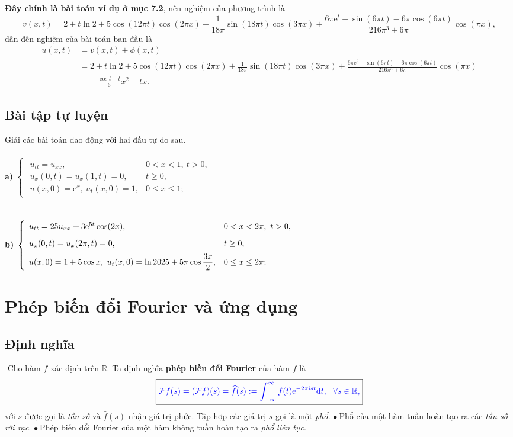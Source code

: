 \documentclass[10pt, a4paper]{article}
\begin{document}
	\textbf{Đây chính là bài toán ví dụ ở mục 7.2}, nên nghiệm của phương trình là $$v(x,t)=2+t\ln2+5\cos(12\pi t)\cos(2\pi x)+\frac{1}{18\pi}\sin(18\pi t)\cos(3\pi x)+\frac{6\pi\mathrm e^t-\sin(6\pi t)-6\pi\cos(6\pi t)}{216\pi^3+6\pi}\cos(\pi x),$$
	dẫn đến nghiệm của bài toán ban đầu là \begin{align*}
		u(x,t)&=v(x,t)+\phi(x,t)\\
		&=2+t\ln2+5\cos(12\pi t)\cos(2\pi x)+\frac{1}{18\pi}\sin(18\pi t)\cos(3\pi x)+\frac{6\pi\mathrm e^t-\sin(6\pi t)-6\pi\cos(6\pi t)}{216\pi^3+6\pi}\cos(\pi x)\\
		&\,\,\,\,\,\,+\frac{\cos t-t}{6}x^2+tx.
	\end{align*}
	\subsection{Bài tập tự luyện}
	Giải các bài toán dao động với hai đầu tự do sau.\\\\
	\textbf{a) }$\begin{cases}
		\begin{array}{ll}
			u_{tt}=u_{xx}, & 0<x<1,~t>0, \\
			u_x(0,t)=u_x(1,t)=0, & t\ge0, \\
			u(x,0)=\mathrm e^x,~u_t(x,0)=1, & 0\le x\le1;
		\end{array}
	\end{cases}$\\\\\\
	\textbf{b) }$\begin{cases}
		\begin{array}{ll}
			u_{tt}=25u_{xx}+3\mathrm e^{5t}\cos(2x), & 0<x<2\pi,~t>0, \\
			\noalign{\vskip6pt}
			u_x(0,t)=u_x(2\pi,t)=0, & t\ge0, \\
			\noalign{\vskip5pt}
			u(x,0)=1+5\cos x,~u_t(x,0)=\ln2025+5\pi\cos\dfrac{3x}{2}, & 0\le x\le2\pi;
		\end{array}
	\end{cases}$
	\newpage
	\section{Phép biến đổi Fourier và ứng dụng}
	\subsection{Định nghĩa}
	\vspace{2mm}
	\quad\,\,Cho hàm $f$ xác định trên $\mathbb R$. Ta định nghĩa \textbf{\color{red}phép biến đổi Fourier} của hàm $f$ là $$\boxed{\color{blue}\mathcal Ff(s)=(\mathcal Ff)(s)=\widehat f(s):=\displaystyle\int_{-\infty}^\infty f(t)\mathrm e^{-2\pi\text{i}st}\text{d}t,~~\forall s\in\mathbb R,}$$
	với $s$ được gọi là \textit{tần số} và $\widehat f(s)$ nhận giá trị phức. Tập hợp các giá trị $s$ gọi là một \textit{phổ.}\vskip7pt
	$\bullet~$Phổ của một hàm tuần hoàn tạo ra các \textit{tần số rời rạc}.\vskip7pt
	$\bullet~$Phép biến đổi Fourier của một hàm không tuần hoàn tạo ra \textit{phổ liên tục}.
\end{document}
